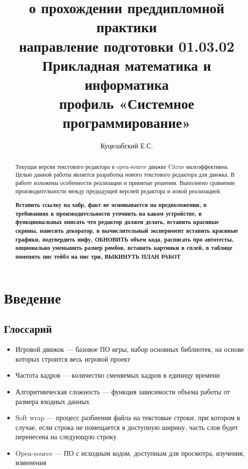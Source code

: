 \documentclass{fefu}
\begin{document}
	\title{о прохождении преддипломной практики\\направление подготовки 01.03.02 
	Прикладная математика и информатика\\профиль «Системное программирование»}
	\author{Куцелабский Е.С.}
	
	\makereporttitle
	\tableofcontents
	\newpage
	
	\begin{abstract}
		\par Текущая версия текстового редактора в open-source движке Citrus малоэффективна.
		Целью данной работы является разработка нового текстового редактора для 
		движка. В работе изложены особенности реализации и принятые решения.
		Выполнено сравнение производительности между предыдущей версией редактора и
		новой реализацией.
		\par \textbf{Вставить ссылку на хабр, факт не основывается на предположении, 
		в требованиях к производительности уточнить на каком устройстве, в функциональных 
		описать что редактор должен делать, вставить красивые скрины, навесить декоратор,
		в вычислительный эксперимент вставить красивые графики, подтвердить инфу, ОБНОВИТЬ
		объем кода, расписать про автотесты, опционально уменьшить размер ромбов, вставить
		картинки в сплей, в таблице поменять пис тейбл на пис три, ВЫКИНУТЬ ПЛАН РАБОТ}
	\end{abstract}

	\section{Введение}
		\subsection{Глоссарий}
			\begin{itemize}
				\item Игровой движок --- базовое ПО игры, набор основных библиотек, на основе
				которых строится весь игровой проект
				\item Частота кадров --- количество сменяемых кадров в единицу времени
				\item Алгоритмическая сложность --- функция зависимости объема работы от 
				размера входных данных
				\item Soft wrap --- процесс разбиения файла на текстовые строки, при котором
				в случае, если строка не помещается в доступную ширину, часть слов будет
				перенесена на следующую строку
				\item Open-source --- ПО с исходным кодом, доступным для просмотра, изучения, 
				изменения
			\end{itemize}
\end{document}
